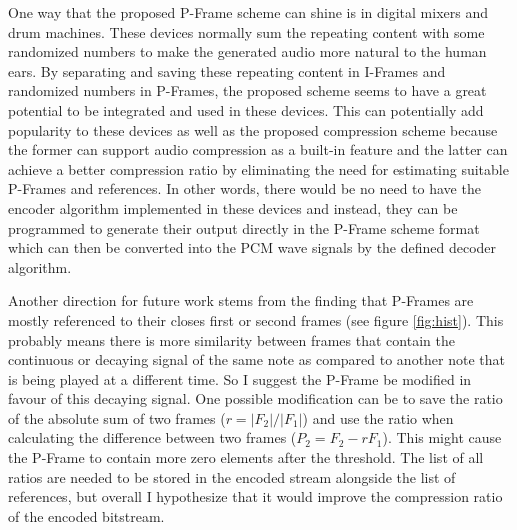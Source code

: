 One way that the proposed P-Frame scheme can shine is in digital mixers and drum machines. These devices normally sum the repeating content with some randomized numbers to make the generated audio more natural to the human ears. By separating and saving these repeating content in I-Frames and randomized numbers in P-Frames, the proposed scheme seems to have a great potential to be integrated and used in these devices. This can potentially add popularity to these devices as well as the proposed compression scheme because the former can support audio compression as a built-in feature and the latter can achieve a better compression ratio by eliminating the need for estimating suitable P-Frames and references. In other words, there would be no need to have the encoder algorithm implemented in these devices and instead, they can be programmed to generate their output directly in the P-Frame scheme format which can then be converted into the PCM wave signals by the defined decoder algorithm.

Another direction for  future work stems from the finding that P-Frames are mostly referenced to their closes first or second frames (see figure \ref{fig:hist}). This probably means there is more similarity between frames that contain the continuous or decaying signal of the same note as compared to another note that is being played at a different time. So I suggest the P-Frame be modified in favour of this decaying signal. One possible modification can be to save the ratio of the absolute sum of two frames ($r = |F_2|/|F_1|$) and use the ratio when calculating the difference between two frames ($P_2=F_2-rF_1$). This might cause the P-Frame to contain more zero elements after the threshold. The list of all ratios are needed to be stored in the encoded stream alongside the list of references, but overall I hypothesize that it would improve the compression ratio of the encoded bitstream.





